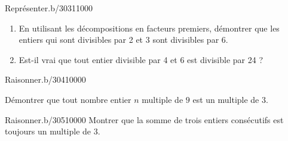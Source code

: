 \begin{pageParcoursd}
 
\begin{ExoCd}{Représenter.}{b/303}{1}{1}{0}{0}{0}

\begin{enumerate}
\item En utilisant les décompositions en facteurs premiers,
  démontrer que les entiers qui sont divisibles par 2 et 3
  sont divisibles par 6. 

\item Est-il vrai que tout entier divisible par 4 et 6 est
  divisible par 24 ? 
\end{enumerate}

 
\end{ExoCd}


  
\begin{ExoCd}{Raisonner.}{b/304}{1}{0}{0}{0}{0}

Démontrer que tout nombre entier $n$ multiple de $9$ est un multiple de $3$.  

\end{ExoCd}



\begin{ExoCd}{Raisonner.}{b/305}{1}{0}{0}{0}{0}
Montrer que la somme de trois entiers consécutifs est toujours un multiple de 3. 
\end{ExoCd}



\end{pageParcoursd}
 
